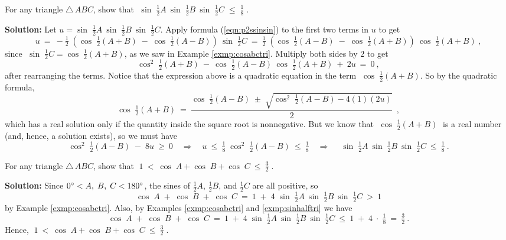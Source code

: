\begin{exmp}\label{exmp:sinhalftri}
 For any triangle $\triangle\,ABC$, show that $\;\sin\;\tfrac{1}{2}A~\sin\;\tfrac{1}{2}B~
 \sin\;\tfrac{1}{2}C \;\le\; \frac{1}{8}\;$.\vspace{1mm}
 \par\noindent\textbf{Solution:} Let $u=\sin\;\tfrac{1}{2}A~\sin\;\tfrac{1}{2}B~\sin\;\tfrac{1}{2}C$.
 Apply formula (\ref{eqn:p2ssinsin}) to the first two terms in $u$ to get
 \begin{displaymath}
  u ~=~ -\tfrac{1}{2}\;(\cos\;\tfrac{1}{2}(A+B) \;-\; \cos\;\tfrac{1}{2}(A-B))~
   \sin\;\tfrac{1}{2}C ~=~ \tfrac{1}{2}\;(\cos\;\tfrac{1}{2}(A-B) \;-\;
   \cos\;\tfrac{1}{2}(A+B))~\cos\;\tfrac{1}{2}(A+B) ~,
 \end{displaymath}
 since $\;\sin\;\tfrac{1}{2}C = \cos\;\tfrac{1}{2}(A+B)$, as we saw in Example \ref{exmp:cosabctri}.
 Multiply both sides by $2$ to get
 \begin{displaymath}
  \cos^2 \;\tfrac{1}{2}(A+B) ~-~ \cos\;\tfrac{1}{2}(A-B)~\cos\;\tfrac{1}{2}(A+B) ~+~ 2u ~=~ 0 ~,
 \end{displaymath}
 after rearranging the terms. Notice that the expression above is a quadratic equation in the
 term $\;\cos\;\tfrac{1}{2}(A+B)$. So by the quadratic formula,
 \begin{displaymath}
  \cos\;\tfrac{1}{2}(A+B) ~=~ \frac{\cos\;\tfrac{1}{2}(A-B) \;\pm\;
   \sqrt{\cos^2 \;\tfrac{1}{2}(A-B) - 4(1)(2u)}}{2} ~~,
 \end{displaymath}
 which has a real solution only if the quantity inside the square root is nonnegative. But we know
 that $\;\cos\;\tfrac{1}{2}(A+B)\;$ is a real number (and, hence, a solution exists), so we must
 have
 \begin{displaymath}
  \cos^2 \;\tfrac{1}{2}(A-B) \;- \; 8u ~\ge~ 0 \quad\Rightarrow\quad u ~\le~ \tfrac{1}{8}\;
  \cos^2 \;\tfrac{1}{2}(A-B) ~\le~ \tfrac{1}{8} \quad\Rightarrow\quad
  \;\sin\;\tfrac{1}{2}A~\sin\;\tfrac{1}{2}B~\sin\;\tfrac{1}{2}C ~\le~ \tfrac{1}{8} ~.
 \end{displaymath}
\end{exmp}
\begin{exmp}\label{exmp:cosabcmax}
 For any triangle $\triangle\,ABC$, show that $\;1 ~<~ \cos\;A + \cos\;B + \cos\;C ~\le~
 \tfrac{3}{2}\;$.\vspace{1mm}
 \par\noindent\textbf{Solution:} Since $0^\circ < A,\; B,\; C < 180^\circ$, the sines of
 $\tfrac{1}{2}A$, $\tfrac{1}{2}B$, and $\tfrac{1}{2}C$ are all positive, so
 \begin{displaymath}
  \cos\;A \;+\; \cos\;B \;+\; \cos\;C ~=~ 1 \;+\;
   4\;\sin\;\tfrac{1}{2}A~\sin\;\tfrac{1}{2}B~\sin\;\tfrac{1}{2}C ~ > ~ 1
 \end{displaymath}
 by Example \ref{exmp:cosabctri}. Also, by Examples \ref{exmp:cosabctri} and \ref{exmp:sinhalftri}
 we have
 \begin{displaymath}
  \cos\;A \;+\; \cos\;B \;+\; \cos\;C ~=~ 1 \;+\;
   4\;\sin\;\tfrac{1}{2}A~\sin\;\tfrac{1}{2}B~\sin\;\tfrac{1}{2}C ~\le~ 1 \;+\;
   4\;\cdot\;\tfrac{1}{8} ~=~ \tfrac{3}{2} ~.
 \end{displaymath}
 Hence, $\;1 ~<~ \cos\;A + \cos\;B + \cos\;C ~\le~ \tfrac{3}{2}\;$.
\end{exmp}
